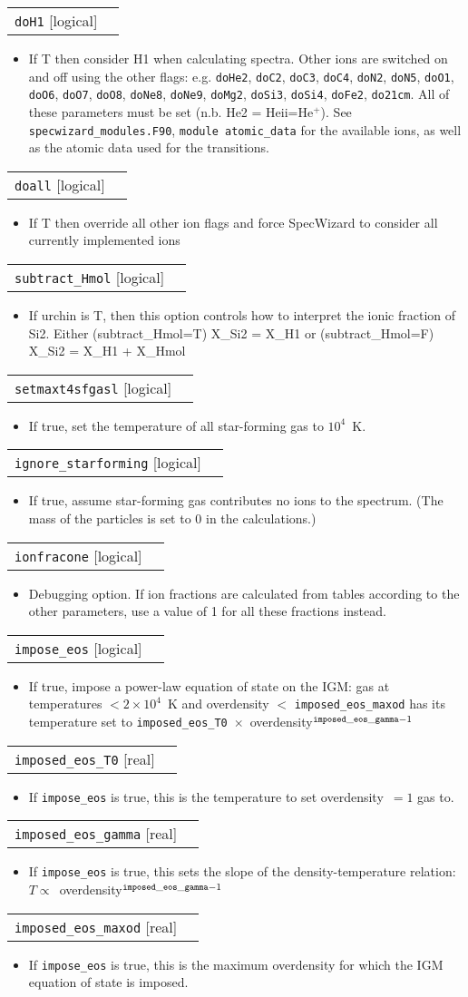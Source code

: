 \documentclass{report}
\makeatletter
\newcommand{\paramdefinition}[3]{
\begin{tabular*}{\textwidth}{l@{\extracolsep{\fill}}r}
		{\tt #1} [{\sc #2}]& #3 \\
\end{tabular*}}
\newcommand{\paramdescription}[1]{
\begin{itemize}
\item #1
\end{itemize}\vspace{0.2cm}}
\newcommand{\param}[1]{{\tt #1}}
\makeatother
\begin{document}
\paramdefinition{doH1}{logical}{}
\paramdescription{If T then consider H1 when calculating spectra.  Other ions are switched on and off using the other flags: e.g. {\tt doHe2}, {\tt doC2}, {\tt doC3}, {\tt doC4}, {\tt doN2}, {\tt doN5}, {\tt doO1}, {\tt doO6}, {\tt doO7}, {\tt doO8}, {\tt doNe8}, {\tt doNe9}, {\tt doMg2}, {\tt doSi3}, {\tt doSi4}, {\tt doFe2}, {\tt do21cm}.  All of these parameters must be set (n.b. He2 = He{\sc ii}=He$^+$). See \param{specwizard\_modules.F90}, \param{module atomic\_data} for the available ions, as well as the atomic data used for the transitions.}

\paramdefinition{doall}{logical}{}
\paramdescription{If T then override all other ion flags and force SpecWizard to consider all currently implemented ions}

\paramdefinition{subtract\_Hmol}{logical}{}
\paramdescription{If urchin is T, then this option controls how to interpret the ionic fraction of Si2. Either (subtract\_Hmol=T) X\_Si2 = X\_H1 or (subtract\_Hmol=F) X\_Si2 = X\_H1 + X\_Hmol}

\paramdefinition{setmaxt4sfgasl}{logical}{}
\paramdescription{If true, set the temperature of all star-forming gas to $10^{4}$~K.}

\paramdefinition{ignore\_starforming}{logical}{}
\paramdescription{If true, assume star-forming gas contributes no ions to the spectrum. (The mass of the particles is set to 0 in the calculations.)}

\paramdefinition{ionfracone}{logical}{}
\paramdescription{Debugging option. If ion fractions are calculated from tables according to the other parameters, use a value of 1 for all these fractions instead.}

\paramdefinition{impose\_eos}{logical}{}
\paramdescription{If true, impose a power-law equation of state on the IGM: gas at temperatures $< 2 \times 10^{4}$~K and overdensity $<$ \param{imposed\_eos\_maxod} has its temperature set to \param{imposed\_eos\_T0}~$\times$~overdensity$^{\param{imposed\_eos\_gamma}-1}$}

\paramdefinition{imposed\_eos\_T0}{real}{}
\paramdescription{If \param{impose\_eos} is true, this is the temperature to set overdensity~$=1$ gas to.}

\paramdefinition{imposed\_eos\_gamma}{real}{}
\paramdescription{If \param{impose\_eos} is true, this sets the slope of the density-temperature relation: $T \propto $~overdensity$^{\param{imposed\_eos\_gamma} - 1}$}

\paramdefinition{imposed\_eos\_maxod}{real}{}
\paramdescription{If \param{impose\_eos} is true, this is the maximum overdensity for which the IGM equation of state is imposed.}
\end{document}
